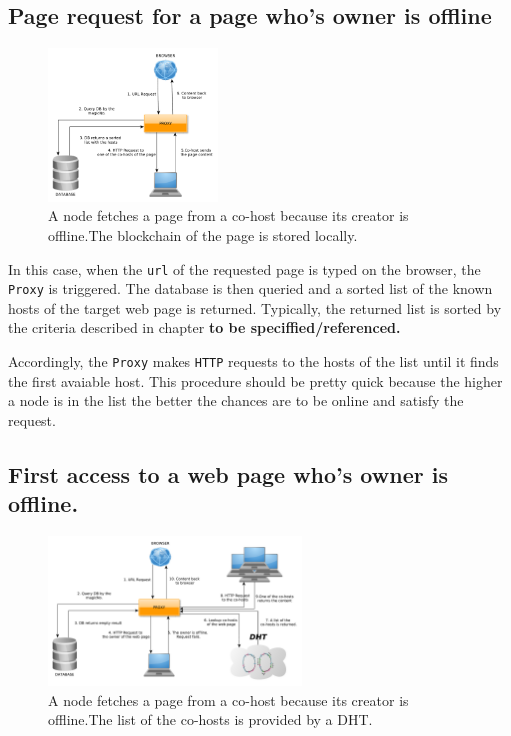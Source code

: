 \subsection{Page request for a page who's owner is offline}

\begin{figure}[htp]
\center
\includegraphics[width=0.4\textwidth]{pictures/fetch_page_offline_creator.pdf}
\caption{A node fetches a page from a co-host because its creator is offline.The 
blockchain of the page is stored locally.}
\label{fig:offline_creator}
\end{figure}

In this case, when the \texttt{url} of the requested page is typed on the browser,
 the \texttt{Proxy} is triggered. The database is then queried and 
a sorted list of the known hosts of the target web page is returned. Typically, 
the returned list is sorted by the criteria described in chapter 
\textbf{to be speciffied/referenced.}

Accordingly, the \texttt{Proxy} makes \texttt{HTTP} requests to the hosts of the list
until it finds the first avaiable host. This procedure should be pretty quick because
the higher a node is in the list the better the chances are to be online and satisfy 
the request. 


\subsection{First access to a web page who's owner is offline.}

\begin{figure}[htp]
\center
\includegraphics[width=0.6\textwidth]{pictures/fetch_page_offline_creator_no_blockchain_stored.pdf}
\caption{A node fetches a page from a co-host because its creator is offline.The list of
the co-hosts is provided by a DHT.}
\label{fig:offline_creator}
\end{figure}

